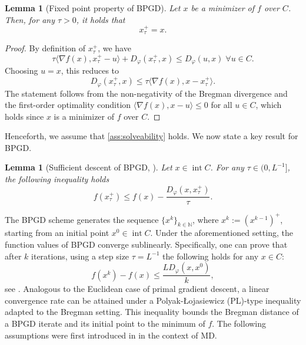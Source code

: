 \documentclass[11pt,reqno]{amsart}
\numberwithin{equation}{section}
\numberwithin{figure}{section}
\theoremstyle{plain}
\newtheorem{lemma}[theorem]{Lemma}
\theoremstyle{definition}
\newcommand{\N}{\mathbb{N}}
\newcommand{\la}{\langle}
\newcommand{\ra}{\rangle}
\newcommand{\vphi}{\varphi}
\newcommand{\df}{\nabla f}
\DeclareMathOperator{\intr}{int}
\begin{document}
\begin{lemma}[Fixed point property of BPGD] \label{lm: fixed point property of BPGD}
    Let $x$ be a minimizer of $f$ over $C$. Then, for any $\tau > 0$, it holds that
    \begin{equation}
        x^+_\tau=x.
    \end{equation}
\end{lemma}
\begin{proof}
By definition of $x^+_\tau$, we have
\begin{equation}
    \tau \la \df(x), x^+_\tau - u \ra + D_\vphi(x^+_\tau, x) \leq  D_\vphi(u,x) \; \forall u \in C.
\end{equation}
Choosing $u = x$, this reduces to
\begin{equation}
    D_\vphi(x^+_\tau, x) \leq \tau \la \df(x), x - x^+_\tau \ra .
\end{equation}
The statement follows from the non-negativity of the Bregman divergence and the first-order optimality condition $\la \df(x), x - u \ra \leq 0$ for all $u \in C$, which holds since $x$ is a minimizer of $f$ over $C$.
\end{proof}

Henceforth, we assume that \cref{ass:solveability} holds. We now state a key result for BPGD.

\begin{lemma}[Sufficient descent of BPGD, \cite{Teboulle_2018}] \label{lm:sufficient-descent-BPGD} Let $x \in \intr C$. For any $\tau \in (0, L^{-1}]$, the following inequality holds
    \begin{equation}
        f(x^+_\tau) \leq f(x) - \frac{D_\vphi(x, x^+_\tau)}{\tau}.
    \end{equation}
\end{lemma}
The BPGD scheme generates the sequence $\{ x^k \}_{k \in \N}$, where $x^k := \left(x^{k-1}\right)^+$, starting from an initial point $x^0 \in \intr C$. 
Under the aforementioned setting, the function values of BPGD converge sublinearly. Specifically, one can prove that after $k$ iterations, using a step size $\tau = L^{-1}$ the following holds for any $x \in C$:
\begin{equation}
    f(x^k) - f(x) \leq \frac{LD_\vphi(x, x^0)}{k},
\end{equation}
see \cite{Nemirovski1983, Teboulle_2018}. Analogous to the Euclidean case of primal gradient descent, a linear convergence rate can be attained under a Polyak-\L{}ojasiewicz (PL)-type inequality adapted to the Bregman setting. This inequality bounds the Bregman distance of a BPGD iterate and its initial point to the minimum of $f$. The following assumptions were first introduced in \cite{Bauschke:19} in the context of MD. 
\end{document}
